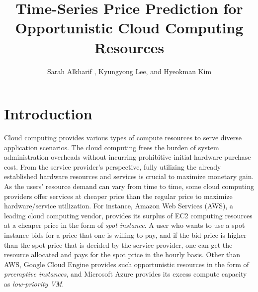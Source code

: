 \documentclass[graybox]{svmult}
\begin{document}
\title*{Time-Series Price Prediction for Opportunistic Cloud Computing Resources}
\author{Sarah Alkharif , Kyungyong Lee, and Hyeokman Kim}
%
%
\maketitle


\section{Introduction}\label{sec:1}
Cloud computing provides various types of compute resources to serve diverse application scenarios. The cloud computing frees the burden of system administration overheads without incurring prohibitive initial hardware purchase cost. From the service provider's perspective, fully utilizing the already established hardware resources and services is crucial to maximize monetary gain. As the users' resource demand can vary from time to time, some cloud computing providers offer services at cheaper price than the regular price to maximize hardware/service utilization. For instance, Amazon Web Services (AWS), a leading cloud computing vendor, provides its surplus of EC2 computing resources at a cheaper price in the form of \emph{spot instance}. A user who wants to use a spot instance bids for a price that one is willing to pay, and if the bid price is higher than the spot price that is decided by the service provider, one can get the resource allocated and pays for the spot price in the hourly basis. Other than AWS, Google Cloud Engine provides such opportunistic resources in the form of \emph{preemptive instances}, and Microsoft Azure provides its excess compute capacity as \emph{low-priority VM}.
\end{document}

